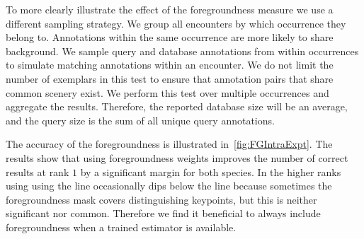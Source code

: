         To more clearly illustrate the effect of the foregroundness measure we use a different sampling strategy.
        We group all encounters by which occurrence they belong to. Annotations within the same occurrence are more
        likely to share background. We sample query and database annotations from within occurrences to simulate
        matching annotations within an encounter. We do not limit the number of exemplars in this test to ensure
        that annotation pairs that share common scenery exist. We perform this test over multiple occurrences and
        aggregate the results. Therefore, the reported database size will be an average, and the query size is the
        sum of all unique query annotations.

        The accuracy of the foregroundness is illustrated in~\cref{fig:FGIntraExpt}. The results show that using
        foregroundness weights improves the number of correct results at rank $1$ by a significant margin for both
        species. In the higher ranks using using the  line occasionally dips below the  line
        because sometimes the foregroundness mask covers distinguishing keypoints, but this is neither significant
        nor common. Therefore we find it beneficial to always include foregroundness when a trained estimator is
        available.

        \FGIntraExpt{}

     
